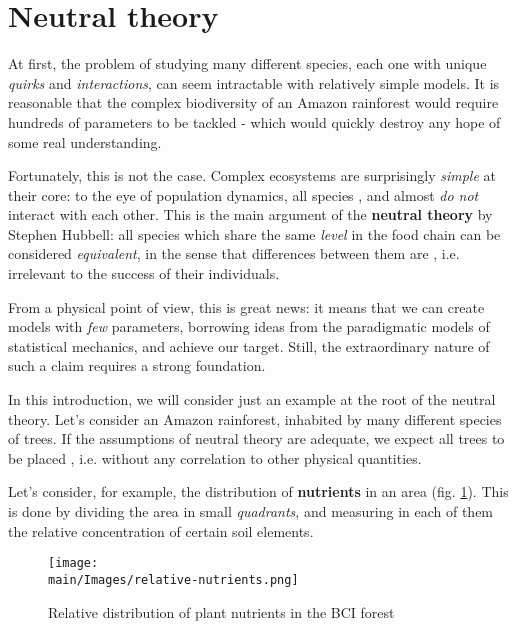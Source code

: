 \documentclass[../../main.tex]{subfiles}
\begin{document}
\section{Neutral theory}
At first, the problem of studying many different species, each one with unique \textit{quirks} and \textit{interactions}, can seem intractable with relatively simple models. It is reasonable that the complex biodiversity of an Amazon rainforest would require hundreds of parameters to be tackled - which would quickly destroy any hope of some real understanding.

\medskip

Fortunately, this is not the case. Complex ecosystems are surprisingly \textit{simple} at their core: to the eye of population dynamics, all species , and almost \textit{do not} interact with each other. This is the main argument of the \textbf{neutral theory} by Stephen Hubbell: all species which share the same \textit{level} in the food chain can be considered \textit{equivalent}, in the sense that differences between them are , i.e. irrelevant to the success of their individuals. 

\medskip

From a physical point of view, this is great news: it means that we can create models with \textit{few} parameters, borrowing ideas from the paradigmatic models of statistical mechanics, and achieve our target. Still, the extraordinary nature of such a claim requires a strong foundation.

\medskip

In this introduction, we will consider just an example at the root of the neutral theory. Let's consider an Amazon rainforest, inhabited by many different species of trees. If the assumptions of neutral theory are adequate, we expect all trees to be placed , i.e. without any correlation to other physical quantities. 

Let's consider, for example, the distribution of \textbf{nutrients} in an area (fig. \ref{fig:relative-nutrients}). This is done by dividing the area in small \textit{quadrants}, and measuring in each of them the relative concentration of certain soil elements.

\begin{figure}[H]
    \centering
    \texttt{[image: \\main/Images/relative-nutrients.png]}
    \caption{Relative distribution of plant nutrients in the BCI forest}
    \label{fig:relative-nutrients}
\end{figure}
\end{document}
